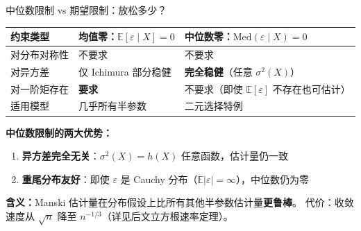 \documentclass[aspectratio=169, 10pt]{beamer}
\begin{document}
\begin{frame}{中位数限制 vs 期望限制：放松多少？}

  \begin{center}\footnotesize
  \begin{tabular}{p{3cm}|p{4.5cm}|p{4.5cm}}
  \hline
  约束类型 & \textbf{均值零}：$\mathbb{E}[\varepsilon \mid X] = 0$ & \textbf{中位数零}：$\text{Med}(\varepsilon \mid X) = 0$ \\
  \hline
  对分布对称性 & 不要求 & 不要求 \\
  \hline
  对异方差 & 仅 Ichimura 部分稳健 & \textbf{完全稳健}（任意 $\sigma^2(X)$）\\
  \hline
  对一阶矩存在 & \textbf{要求} & 不要求（即使 $\mathbb{E}[\varepsilon]$ 不存在也可估计）\\
  \hline
  适用模型 & 几乎所有半参数 & 二元选择特例 \\
  \hline
  \end{tabular}
  \end{center}

  \begin{highlightbox}
    \textbf{中位数限制的两大优势：}
    \begin{enumerate}\setlength{\itemsep}{1pt}
      \item \textbf{异方差完全无关}：$\sigma^2(X) = h(X)$ 任意函数，估计量仍一致
      \item \textbf{重尾分布友好}：即使 $\varepsilon$ 是 Cauchy 分布（$\mathbb{E}|\varepsilon| = \infty$），中位数仍为零
    \end{enumerate}
  \end{highlightbox}

  \begin{keybox}
    \textbf{含义：}Manski 估计量在分布假设上比所有其他半参数估计量\textbf{更鲁棒}。
    代价：收敛速度从 $\sqrt{n}$ 降至 $n^{-1/3}$（详见后文立方根速率定理）。
  \end{keybox}

\end{frame}
\end{document}
